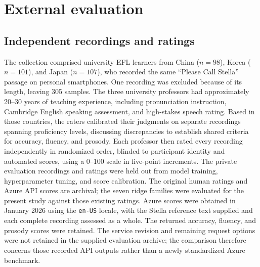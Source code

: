 \documentclass[cameraready]{Interspeech}
\begin{document}
\section{External evaluation}
\subsection{Independent recordings and ratings}
The collection comprised university EFL learners from China ($n=98$), Korea ($n=101$), and Japan ($n=107$), who recorded the same ``Please Call Stella'' passage on personal smartphones. One recording was excluded because of its length, leaving 305 samples. The three university professors had approximately 20--30 years of teaching experience, including pronunciation instruction, Cambridge English speaking assessment, and high-stakes speech rating. Based in those countries, the raters calibrated their judgments on separate recordings spanning proficiency levels, discussing discrepancies to establish shared criteria for accuracy, fluency, and prosody. Each professor then rated every recording independently in randomized order, blinded to participant identity and automated scores, using a 0--100 scale in five-point increments. The private evaluation recordings and ratings were held out from model training, hyperparameter tuning, and score calibration. The original human ratings and Azure API scores are archival; the seven ridge families were evaluated for the present study against those existing ratings. Azure scores were obtained in January 2026 using the \texttt{en-US} locale, with the Stella reference text supplied and each complete recording assessed as a whole. The returned accuracy, fluency, and prosody scores were retained. The service revision and remaining request options were not retained in the supplied evaluation archive; the comparison therefore concerns those recorded API outputs rather than a newly standardized Azure benchmark.
\end{document}
